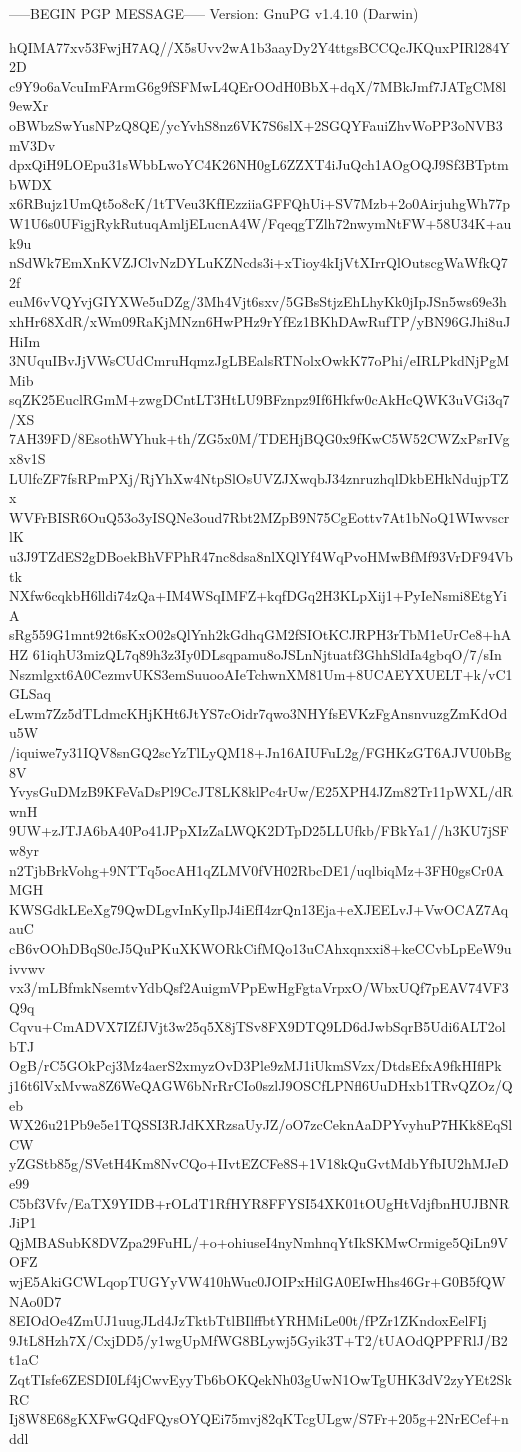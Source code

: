 -----BEGIN PGP MESSAGE-----
Version: GnuPG v1.4.10 (Darwin)

hQIMA77xv53FwjH7AQ//X5sUvv2wA1b3aayDy2Y4ttgsBCCQcJKQuxPIRl284Y2D
c9Y9o6aVcuImFArmG6g9fSFMwL4QErOOdH0BbX+dqX/7MBkJmf7JATgCM8l9ewXr
oBWbzSwYusNPzQ8QE/ycYvhS8nz6VK7S6slX+2SGQYFauiZhvWoPP3oNVB3mV3Dv
dpxQiH9LOEpu31sWbbLwoYC4K26NH0gL6ZZXT4iJuQch1AOgOQJ9Sf3BTptmbWDX
x6RBujz1UmQt5o8cK/1tTVeu3KfIEzziiaGFFQhUi+SV7Mzb+2o0AirjuhgWh77p
W1U6s0UFigjRykRutuqAmljELucnA4W/FqeqgTZlh72nwymNtFW+58U34K+auk9u
nSdWk7EmXnKVZJClvNzDYLuKZNcds3i+xTioy4kIjVtXIrrQlOutscgWaWfkQ72f
euM6vVQYvjGIYXWe5uDZg/3Mh4Vjt6sxv/5GBsStjzEhLhyKk0jIpJSn5ws69e3h
xhHr68XdR/xWm09RaKjMNzn6HwPHz9rYfEz1BKhDAwRufTP/yBN96GJhi8uJHiIm
3NUquIBvJjVWsCUdCmruHqmzJgLBEalsRTNolxOwkK77oPhi/eIRLPkdNjPgMMib
sqZK25EuclRGmM+zwgDCntLT3HtLU9BFznpz9If6Hkfw0cAkHcQWK3uVGi3q7/XS
7AH39FD/8EsothWYhuk+th/ZG5x0M/TDEHjBQG0x9fKwC5W52CWZxPsrIVgx8v1S
LUlfcZF7fsRPmPXj/RjYhXw4NtpSlOsUVZJXwqbJ34znruzhqlDkbEHkNdujpTZx
WVFrBISR6OuQ53o3yISQNe3oud7Rbt2MZpB9N75CgEottv7At1bNoQ1WIwvscrlK
u3J9TZdES2gDBoekBhVFPhR47nc8dsa8nlXQlYf4WqPvoHMwBfMf93VrDF94Vbtk
NXfw6cqkbH6lldi74zQa+IM4WSqIMFZ+kqfDGq2H3KLpXij1+PyIeNsmi8EtgYiA
sRg559G1mnt92t6sKxO02sQlYnh2kGdhqGM2fSIOtKCJRPH3rTbM1eUrCe8+hAHZ
61iqhU3mizQL7q89h3z3Iy0DLsqpamu8oJSLnNjtuatf3GhhSldIa4gbqO/7/sIn
Nszmlgxt6A0CezmvUKS3emSuuooAIeTchwnXM81Um+8UCAEYXUELT+k/vC1GLSaq
eLwm7Zz5dTLdmcKHjKHt6JtYS7cOidr7qwo3NHYfsEVKzFgAnsnvuzgZmKdOdu5W
/iquiwe7y31IQV8snGQ2scYzTlLyQM18+Jn16AIUFuL2g/FGHKzGT6AJVU0bBg8V
YvysGuDMzB9KFeVaDsPl9CcJT8LK8klPc4rUw/E25XPH4JZm82Tr11pWXL/dRwnH
9UW+zJTJA6bA40Po41JPpXIzZaLWQK2DTpD25LLUfkb/FBkYa1//h3KU7jSFw8yr
n2TjbBrkVohg+9NTTq5ocAH1qZLMV0fVH02RbcDE1/uqlbiqMz+3FH0gsCr0AMGH
KWSGdkLEeXg79QwDLgvInKyIlpJ4iEfI4zrQn13Eja+eXJEELvJ+VwOCAZ7AqauC
cB6vOOhDBqS0cJ5QuPKuXKWORkCifMQo13uCAhxqnxxi8+keCCvbLpEeW9uivvwv
vx3/mLBfmkNsemtvYdbQsf2AuigmVPpEwHgFgtaVrpxO/WbxUQf7pEAV74VF3Q9q
Cqvu+CmADVX7IZfJVjt3w25q5X8jTSv8FX9DTQ9LD6dJwbSqrB5Udi6ALT2olbTJ
OgB/rC5GOkPcj3Mz4aerS2xmyzOvD3Ple9zMJ1iUkmSVzx/DtdsEfxA9fkHIflPk
j16t6lVxMvwa8Z6WeQAGW6bNrRrCIo0szlJ9OSCfLPNfl6UuDHxb1TRvQZOz/Qeb
WX26u21Pb9e5e1TQSSI3RJdKXRzsaUyJZ/oO7zcCeknAaDPYvyhuP7HKk8EqSlCW
yZGStb85g/SVetH4Km8NvCQo+IIvtEZCFe8S+1V18kQuGvtMdbYfbIU2hMJeDe99
C5bf3Vfv/EaTX9YIDB+rOLdT1RfHYR8FFYSI54XK01tOUgHtVdjfbnHUJBNRJiP1
QjMBASubK8DVZpa29FuHL/+o+ohiuseI4nyNmhnqYtIkSKMwCrmige5QiLn9VOFZ
wjE5AkiGCWLqopTUGYyVW410hWuc0JOIPxHilGA0EIwHhs46Gr+G0B5fQWNAo0D7
8EIOdOe4ZmUJ1uugJLd4JzTktbTtlBIlffbtYRHMiLe00t/fPZr1ZKndoxEelFIj
9JtL8Hzh7X/CxjDD5/y1wgUpMfWG8BLywj5Gyik3T+T2/tUAOdQPPFRlJ/B2t1aC
ZqtTIsfe6ZESDI0Lf4jCwvEyyTb6bOKQekNh03gUwN1OwTgUHK3dV2zyYEt2SkRC
Ij8W8E68gKXFwGQdFQysOYQEi75mvj82qKTcgULgw/S7Fr+205g+2NrECef+nddl
